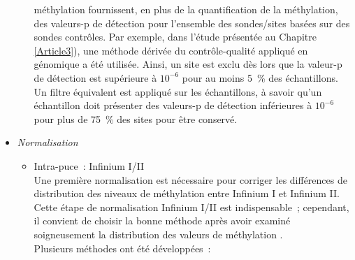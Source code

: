 \documentclass[11pt,a4paper,notrimn]{krantz}
\theoremstyle{definition}
\theoremstyle{definition}
\theoremstyle{remark}
\begin{document}
\begin{itemize}
\begin{itemize}
    méthylation fournissent, en plus de la quantification de la
    méthylation, des valeurs-p de détection pour l'ensemble des
    sondes/sites basées sur des sondes contrôles. Par exemple, dans
    l'étude présentée au Chapitre \ref{Article3}), une méthode dérivée
    du contrôle-qualité appliqué en génomique a été utilisée. Ainsi, un
    site est exclu dès lors que la valeur-p de détection est supérieure
    à \(10^{-6}\) pour au moins 5~\% des échantillons. Un filtre
    équivalent est appliqué sur les échantillons, à savoir qu'un
    échantillon doit présenter des valeurs-p de détection inférieures à
    \(10^{-6}\) pour plus de 75~\% des sites pour être conservé.
  \end{itemize}
\item
  \emph{Normalisation}

  \begin{itemize}
  \item
    Intra-puce~: Infinium I/II\\
    Une première normalisation est nécessaire pour corriger les
    différences de distribution des niveaux de méthylation entre
    Infinium I et Infinium II. Cette étape de normalisation Infinium
    I/II est indispensable~; cependant, il convient de choisir la bonne
    méthode après avoir examiné soigneusement la distribution des
    valeurs de méthylation
    \citep{marabita_evaluation_2013, yousefi_considerations_2013}.\\
    Plusieurs méthodes ont été développées~:


\end{itemize}
\end{itemize}
\end{document}
